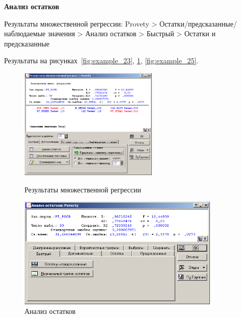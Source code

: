 \newpage

\begin{center}
  \textbf{Анализ остатков}
\end{center}

Результаты множественной регрессии: Provety > Остатки/предсказанные/наблюдаемые значения > Анализ остатков > Быстрый > Остатки и предсказанные

Результаты на рисунках~\ref{fig:example_23}, \ref{fig:example_24}, \ref{fig:example_25}.

\begin{figure}[!h]
  \centering
  \begin{minipage}{0.29\textwidth}
    \centering

    \includegraphics[height=5.3cm]
    {inc/example_23.PNG}

    \caption{Результаты множественной регрессии}
    \label{fig:example_23}
  \end{minipage}
  \begin{minipage}{0.69\textwidth}
    \centering

    \includegraphics[height=5.3cm]
    {inc/example_24.PNG}

    \caption{Анализ остатков}
    \label{fig:example_24}
  \end{minipage}
\end{figure}

